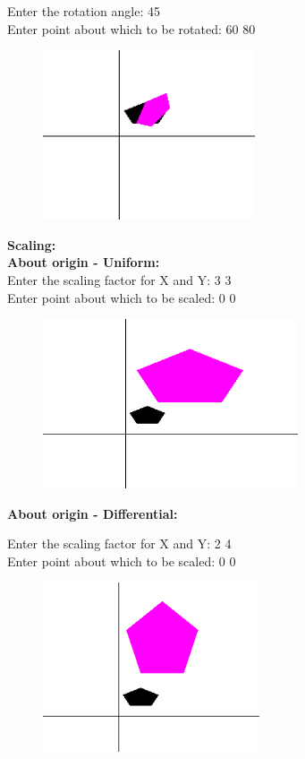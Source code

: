 \documentclass[9pt,letterpaper]{article}
\begin{document}
Enter the rotation angle: 45\\
Enter point about which to be rotated: 60 80\\

\begin{figure}[h]
    \centering
    \includegraphics[height=5cm]{Outputs/OP4.png}
\end{figure}


\newpage
\textbf{\large{Scaling: }}\\
\textbf{About origin - Uniform:}\\

Enter the scaling factor for X and Y: 3 3\\
Enter point about which to be scaled: 0 0

\begin{figure}[h]
    \centering
    \includegraphics[height=5cm]{Outputs/OP5.png}
\end{figure}

\textbf{About origin - Differential:}

Enter the scaling factor for X and Y: 2 4\\
Enter point about which to be scaled: 0 0

\begin{figure}[h]
    \centering
    \includegraphics[height=5cm]{Outputs/OP6.png}
\end{figure}
\end{document}
